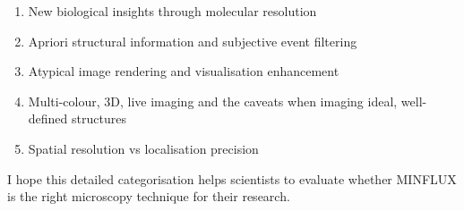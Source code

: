 \documentclass[9pt,twocolumn,twoside]{pnas-new}
\begin{document}
\begin{singlespace}
\begin{enumerate}
\item New biological insights through molecular resolution
\item Apriori structural information and subjective event filtering
\item Atypical image rendering and visualisation enhancement
\item Multi-colour, 3D, live imaging and the caveats when imaging ideal, well-defined structures
\item Spatial resolution vs localisation precision
\end{enumerate}
\end{singlespace}
\noindent
I hope this detailed categorisation helps scientists to evaluate whether MINFLUX is the right microscopy technique for their research. 
\end{document}
